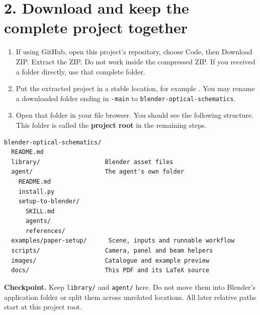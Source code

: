 \documentclass[11pt,a4paper]{article}
\begin{document}
\section*{2. Download and keep the complete project together}
\begin{enumerate}
\item If using GitHub, open this project's repository, choose Code, then Download ZIP. Extract the ZIP. Do not work inside the compressed ZIP. If you received a folder directly, use that complete folder.
\item Put the extracted project in a stable location, for example . You may rename a downloaded folder ending in \texttt{-main} to \texttt{blender-optical-schematics}.
\item Open that folder in your file browser. You should see the following structure. This folder is called the \textbf{project root} in the remaining steps.
\end{enumerate}
\begin{Verbatim}[fontsize=\small]
blender-optical-schematics/
  README.md
  library/                  Blender asset files
  agent/                    The agent's own folder
    README.md
    install.py
    setup-to-blender/
      SKILL.md
      agents/
      references/
  examples/paper-setup/      Scene, inputs and runnable workflow
  scripts/                  Camera, panel and beam helpers
  images/                   Catalogue and example preview
  docs/                     This PDF and its LaTeX source
\end{Verbatim}
\textbf{Checkpoint.} Keep \texttt{library/} and \texttt{agent/} here. Do not move them into Blender's application folder or split them across unrelated locations. All later relative paths start at this project root.
\clearpage
\end{document}
